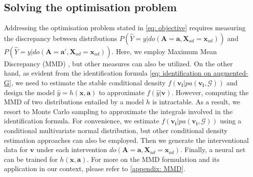 \documentclass{article} %
\begin{document}
\subsection{Solving the optimisation problem}


Addressing the optimisation problem stated in \cref{eq: objective} requires measuring the discrepancy between distributions $P(\hat{Y}=y|do(\mathbf{A}=\mathbf{a},\mathbf{X}_{ad}=\mathbf{x}_{ad}))$ and $P(\hat{Y}=y|do(\mathbf{A}=\mathbf{a'}, \mathbf{X}_{ad}=\mathbf{x}_{ad}))$. Here, we employ Maximum Mean Discrepancy (MMD) \citep{gretton2007kernel}, but other measures can also be utilized. On the other hand, as evident from the identification formula \cref{eq: identification on augmented-G}, we need to estimate the stable conditional density $f(\mathbf{v_i}|pa(\mathbf{v_i}, \mathcal{G}))$ and design the model $\hat{y} = h(\mathbf{x}, \mathbf{a})$ to approximate $f(\hat{y}|\mathbf{v})$. However, computing the MMD of two distributions entailed by a model $h$ is intractable. As a result, we resort to Monte Carlo sampling to approximate the integrals involved in the identification formula. For convenience, we estimate $f(\mathbf{v_i}|pa(\mathbf{v_i, \mathcal{G}}))$ using a conditional multivariate normal distribution, but other conditional density estimation approaches can also be employed. Then we generate the interventional data for $\mathbf{v}$ under each intervention $do(\mathbf{A}=\mathbf{a}, \mathbf{X}_{ad}=\mathbf{x}_{ad})$. Finally, a neural net can be trained for $h(\mathbf{x}, \mathbf{a})$. For more on the MMD formulation and its application in our context, please refer to \cref{appendix: MMD}.
\end{document}
